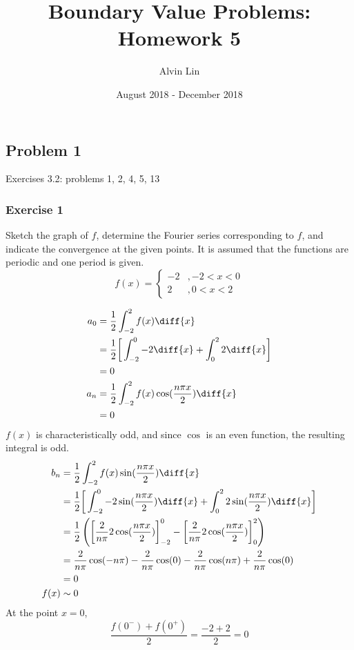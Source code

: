 \documentclass{math}
\title{Boundary Value Problems: Homework 5}
\author{Alvin Lin}
\date{August 2018 - December 2018}
\begin{document}
\maketitle

\subsection*{Problem 1}
Exercises 3.2: problems 1, 2, 4, 5, 13

\subsubsection*{Exercise 1}
Sketch the graph of \( f \), determine the Fourier series corresponding to
\( f \), and indicate the convergence at the given points. It is assumed that
the functions are periodic and one period is given.
\[ f(x) = \begin{cases}
  -2 &, -2<x<0 \\
  2 &, 0<x<2
\end{cases} \]
\begin{center}
\end{center}
\begin{align*}
  a_0 &= \frac{1}{2}\int_{-2}^{2}f(x)\diff{x} \\
  &= \frac{1}{2}\bigg[\int_{-2}^{0}-2\diff{x}+\int_{0}^{2}2\diff{x}\bigg] \\
  &= 0 \\
  a_n &= \frac{1}{2}\int_{-2}^{2}f(x)\cos(\frac{n\pi x}{2})\diff{x} \\
  &= 0
\end{align*}
\( f(x) \) is characteristically odd, and since \( \cos \) is an even function,
the resulting integral is odd.
\begin{align*}
  b_n &= \frac{1}{2}\int_{-2}^{2}f(x)\sin(\frac{n\pi x}{2})\diff{x} \\
  &= \frac{1}{2}\bigg[\int_{-2}^{0}-2\sin(\frac{n\pi x}{2})\diff{x}+
    \int_{0}^{2}2\sin(\frac{n\pi x}{2})\diff{x}\bigg] \\
  &= \frac{1}{2}\left(
    \bigg[\frac{2}{n\pi}2\cos(\frac{n\pi x}{2})\bigg]_{-2}^{0}-
    \bigg[\frac{2}{n\pi}2\cos(\frac{n\pi x}{2})\bigg]_{0}^{2}\right) \\
  &= \frac{2}{n\pi}\cos(-n\pi)-\frac{2}{n\pi}\cos(0)-
    \frac{2}{n\pi}\cos(n\pi)+\frac{2}{n\pi}\cos(0) \\
  &= 0 \\
  f(x) &\sim 0
\end{align*}
At the point \( x = 0 \),
\[ \frac{f(0^-)+f(0^+)}{2} = \frac{-2+2}{2} = 0 \]
\end{document}
